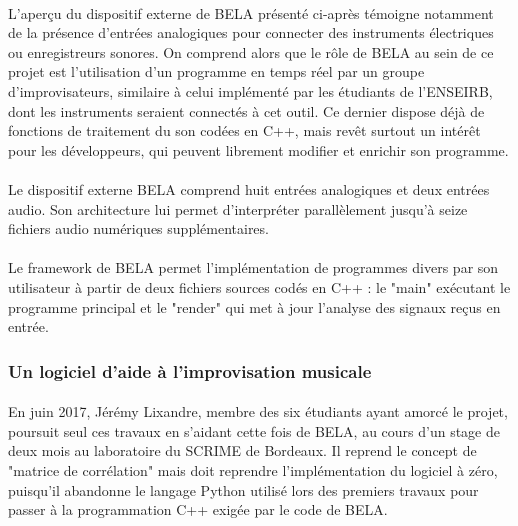 \paragraph{}
L'aperçu du dispositif externe de BELA présenté ci-après témoigne
notamment de la présence d'entrées analogiques pour connecter des
instruments électriques ou enregistreurs sonores. On comprend alors
que le rôle de BELA au sein de ce projet est l'utilisation d'un
programme en temps réel par un groupe d'improvisateurs,
similaire à celui implémenté par les étudiants de l'ENSEIRB, dont les
instruments seraient connectés à cet outil. Ce dernier dispose déjà de
fonctions de traitement du son codées en C++, mais revêt surtout un intérêt
pour les développeurs, qui peuvent librement modifier et enrichir son
programme.
\paragraph{}
Le dispositif externe BELA comprend huit entrées analogiques et deux
entrées audio. Son architecture lui permet d'interpréter parallèlement
jusqu'à seize fichiers audio numériques supplémentaires.
\paragraph{}
Le framework de BELA permet l'implémentation de programmes divers par
son utilisateur à partir de deux fichiers sources codés en C++ : le
"main" exécutant le programme principal et le "render" qui met à jour
l'analyse des signaux reçus en entrée.

\subsubsection{Un logiciel d'aide à l'improvisation musicale}
\paragraph{}
En juin 2017, Jérémy Lixandre, membre des six étudiants ayant amorcé
le projet, poursuit seul ces travaux en s'aidant cette fois de BELA,
au cours d'un stage de deux mois au laboratoire du SCRIME de
Bordeaux. Il reprend le concept de "matrice de corrélation" mais
doit reprendre l'implémentation du logiciel à zéro, puisqu'il
abandonne le langage Python utilisé lors des premiers travaux pour
passer à la programmation C++ exigée par le code de BELA.
